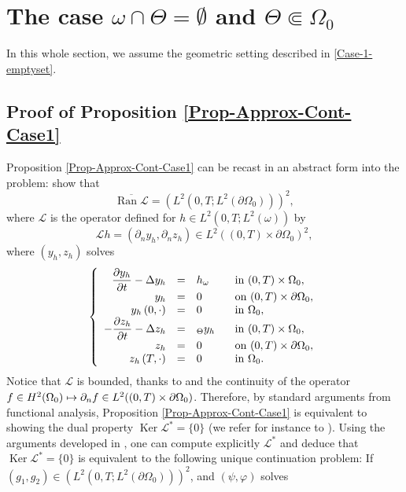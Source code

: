 \documentclass[11pt]{article}
\makeatletter
\numberwithin{equation}{section}
\newcommand\mto{\mathchoice{\longmapsto}{\mapsto}{\mapsto}{\mapsto}}
\DeclareMathOperator{\Ker}{Ker}
\DeclareMathOperator{\Ran}{Ran}
\DeclareRobustCommand{\mathbbm}[1]{\csname jepbb@#1\endcsname}
\theoremstyle{definition}
\makeatother
\begin{document}
\section{The case \texorpdfstring{$\omega \cap \Theta = \emptyset$ and $\Theta \Subset \Omega_0$}{om}}
\label{Sec-Omega-Theta-Empty}
In this whole section, we assume the geometric setting described in \eqref{Case-1-emptyset}.

\subsection{Proof of Proposition \ref{Prop-Approx-Cont-Case1}}\label{Subsec-Proof-ApproxCont-Case1}
Proposition \ref{Prop-Approx-Cont-Case1} can be recast in an abstract form into the problem: show that
\[
\overline{ \Ran \mathcal{L} } = (L^2(0,T; L^2(\partial\Omega_0)))^2,
\]
where $\mathcal{L}$ is the operator defined for $h \in L^2(0,T; L^2(\omega))$ by
\[
\mathcal{L} h = (\partial_n y_h, \partial_n z_h)\in L^2((0,T)\times\partial\Omega_0)^2,
\]
where $(y_h,z_h)$ solves
\begin{equation}\label{csanss}
\left\{
\begin{array}{rcll}
\dfrac{\partial y_h}{\partial t}-\Delta y_h &=&h\mathbbm{1}_{\omega}\quad&\text{ in }(0,T) \times \Omega_0,
\\
y_h &=& 0 &\text{ on }(0,T) \times \partial \Omega_0,
\\
y_h\left(0,\cdot\right) &=& 0 &\text{ in }\Omega_0,
\\
-\dfrac{\partial z_h}{\partial t}-\Delta z_h &=&\mathbbm{1}_{\Theta}y_h &\text{ in }(0,T) \times \Omega_0,
\\
z_h &=& 0 &\text{ on }(0,T) \times \partial \Omega_0,
\\
z_h\left(T,\cdot\right) &=& 0 &\text{ in }\Omega_0.
\end{array}
\right.
\end{equation}
Notice that $\mathcal L$ is bounded, thanks to \cite[Th.\,5, p.\,382]{Evans} and the continuity of the operator $f\in H^2(\Omega_0) \mto \partial_n f\in L^2((0,T)\times\partial\Omega_0)$.
Therefore, by standard arguments from functional analysis, Proposition \ref{Prop-Approx-Cont-Case1} is equivalent to showing the dual property $\Ker\mathcal{L}^* = \{0\}$ (we refer for instance to \cite[Cor.\,2.18]{Brezis}). Using the arguments developed in \cite[Prop.\,2.1]{Lissy-Privat-Simpore}, one can compute explicitly $\mathcal L^*$ and deduce that $\Ker\mathcal{L}^* = \{0\}$ is equivalent to the following unique continuation problem: If $(g_1, g_2) \in (L^2(0,T; L^2(\partial\Omega_0)))^2$, and $(\psi, \varphi)$ solves
\end{document}
